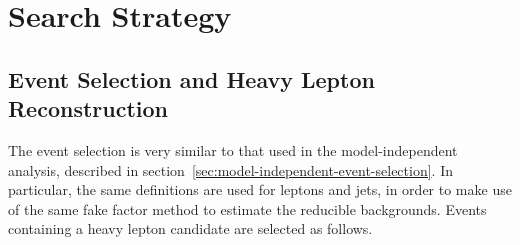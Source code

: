 \section{Search Strategy}\label{sec:resonance-search-strategy}
\subsection{Event Selection and Heavy Lepton Reconstruction}\label{sec:event-3l-selection}
The event selection is very similar to that used in the model-independent analysis, described in section~\ref{sec:model-independent-event-selection}. In particular, the same definitions are used for leptons and jets, in order to make use of the same fake factor method to estimate the reducible backgrounds. Events containing a heavy lepton candidate are selected as follows.

